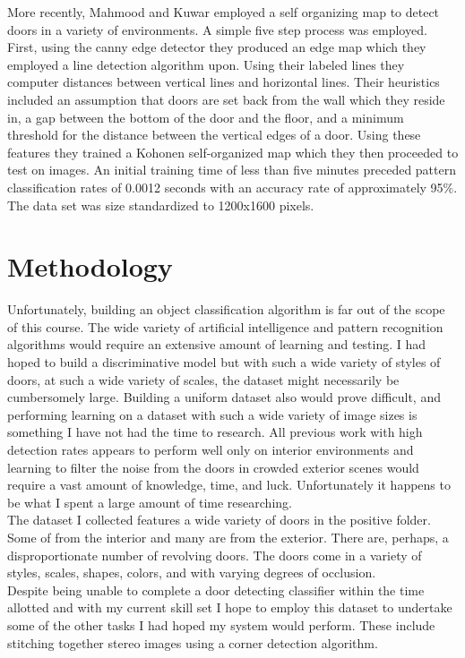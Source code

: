 \documentclass[twocolumn,nofootinbib,%
notitlepage,10pt]{report}
\begin{document}
\indent More recently, Mahmood and Kuwar \cite{mahmood} employed a self organizing map to detect doors in a  variety of environments. A simple five step process was employed. First, using the canny edge detector they produced an edge map which they employed a line detection algorithm upon. Using their labeled lines they computer distances between vertical lines and horizontal lines. Their heuristics included an assumption that doors are set back from the wall which they reside in, a gap between the bottom of the door and the floor, and a minimum threshold for the distance between the vertical edges of a door. Using these features they trained a Kohonen self-organized map which they then proceeded to test on images. An initial training time of less than five minutes preceded pattern classification rates of 0.0012 seconds with an accuracy rate of approximately 95\%. The data set was size standardized to 1200x1600 pixels.\\

\section{Methodology}
Unfortunately, building an object classification algorithm is far out of the scope of this course. The wide variety of artificial intelligence and pattern recognition algorithms would require an extensive amount of learning and testing. I had hoped to build a discriminative model but with such a wide variety of styles of doors, at such a wide variety of scales, the dataset might necessarily be cumbersomely large. Building a uniform dataset also would prove difficult, and performing learning on a dataset with such a wide variety of image sizes is something I have not had the time to research. All previous work with high detection rates appears to perform well only on interior environments and learning to filter the noise from the doors in crowded exterior scenes would require a vast amount of knowledge, time, and luck. Unfortunately it happens to be what I spent a large amount of time researching.\\
\indent The dataset I collected features a wide variety of doors in the positive folder. Some of from the interior and many are from the exterior. There are, perhaps, a disproportionate number of revolving doors. The doors come in a variety of styles, scales, shapes, colors, and with varying degrees of occlusion.\\
\indent Despite being unable to complete a door detecting classifier within the time allotted and with my current skill set I hope to employ this dataset to undertake some of the other tasks I had hoped my system would perform. These include stitching together stereo images using a corner detection algorithm.
\end{document}

